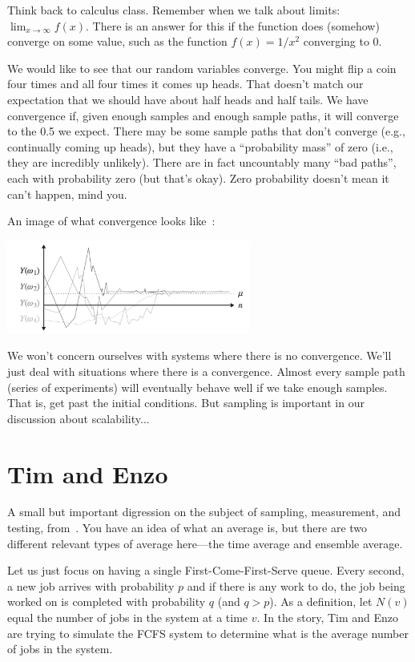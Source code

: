 \documentclass[a4paper]{report}
\begin{document}
Think back to calculus class. Remember when we talk about limits: $\lim_{x\to\infty} f(x)$. There is an answer for this if the function does (somehow) converge on some value, such as the function $f(x) = 1/x^{2}$ converging to 0.

We would like to see that our random variables converge. You might flip a coin four times and all four times it comes up heads. That doesn't match our expectation that we should have about half heads and half tails. We have convergence if, given enough samples and enough sample paths, it will converge to the 0.5 we expect. There may be some sample paths that don't converge (e.g., continually coming up heads), but they have a ``probability mass'' of zero (i.e., they are incredibly unlikely).  There are in fact uncountably many ``bad paths'', each with probability zero (but that's okay). Zero probability doesn't mean it can't happen, mind you.

An image of what convergence looks like~\cite{pmd}:

\begin{center}
	\includegraphics[width=0.6\textwidth]{images/convergence.png}
\end{center}

We won't concern ourselves with systems where there is no convergence. We'll just deal with situations where there is a convergence. Almost every sample path (series of experiments) will eventually behave well if we take enough samples. That is, get past the initial conditions. But sampling is important in our discussion about scalability...

\section*{Tim and Enzo}
A small but important digression on the subject of sampling, measurement, and testing, from~\cite{pmd}. You have an idea of what an average is, but there are two different relevant types of average here---the time average and ensemble average. 

Let us just focus on having a single First-Come-First-Serve queue. Every second, a new job arrives with probability $p$ and if there is any work to do, the job being worked on is completed with probability $q$ (and $q > p$). As a definition, let $N(v)$ equal the number of jobs in the system at a time $v$. In the story, Tim and Enzo are trying to simulate the FCFS system to determine what is the average number of jobs in the system. 
\end{document}
